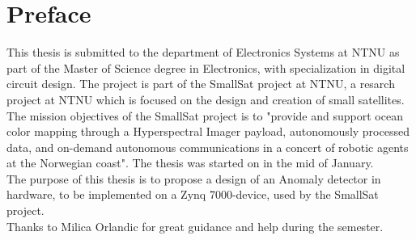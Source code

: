 \newpage
\chapter*{Preface}




This thesis is submitted to the department of Electronics Systems at NTNU as part of the Master of Science degree in Electronics, with specialization in digital circuit design. The project is part of the SmallSat project at NTNU, a resarch project at NTNU which is focused on the design and creation of small satellites. The mission objectives of the SmallSat project is to "provide and support ocean color mapping through a Hyperspectral Imager payload, autonomously processed data, and on-demand autonomous communications in a concert of robotic agents at the Norwegian coast". The thesis was started on in the mid of January. 
\\

The purpose of this thesis is to propose a design of an Anomaly detector in hardware, to be implemented on a Zynq 7000-device, used by the SmallSat project. 
\\


Thanks to Milica Orlandic for great guidance and help during the semester.




